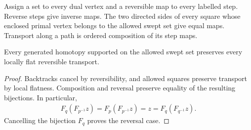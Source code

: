 \begin{definition}
    \label{def:peps_dual_flat_transport}
    \leanok
    Assign a set to every dual vertex and a reversible map to every
    labelled step. Reverse steps give inverse maps. The two directed
    sides of every square whose enclosed primal vertex belongs to the
    allowed swept set give equal maps. Transport along a path is ordered
    composition of its step maps.
\end{definition}

\begin{lemma}
    \label{lem:peps_dual_flat_transport_invariance}
    \leanok
    Every generated homotopy supported on the allowed swept set
    preserves every locally flat reversible transport.
\end{lemma}
\begin{proof}\leanok
    Backtracks cancel by reversibility, and allowed squares preserve
    transport by local flatness. Composition and reversal preserve
    equality of the resulting bijections. In particular,
    \begin{align}
        F_q(F_{p^{-1}}z)=F_p(F_{p^{-1}}z)=z=F_q(F_{q^{-1}}z).
        \label{eq:peps_flat_transport_reverse}
    \end{align}
    Cancelling the bijection $F_q$ proves the reversal case.
\end{proof}

